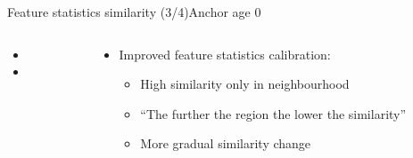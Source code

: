 \begin{frame}{Feature statistics similarity (3/4)}{Anchor age 0}
\begin{columns}
\begin{column}{0.5\textwidth}
\begin{itemize}
				\item {}
				\item {}
			\end{itemize}
		\end{column}
		\begin{column}{0.5\textwidth}
			\begin{itemize}
				\item Improved feature statistics calibration:
				\begin{itemize}
					\vspace{-1.5em}
					\scriptsize
					\item High similarity only in neighbourhood
					\item ``The further the region the lower the similarity''
					\item More gradual similarity change
				\end{itemize}
			\end{itemize}
		\end{column}
	\end{columns}
\end{frame}

